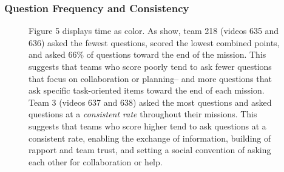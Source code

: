 \newpage%

\subsubsection{Question Frequency and Consistency}




\begin{figure}[h!]
    \centering
    \caption{Figure 5 displays time as color. As show, team 218 (videos 635 and 636) asked the
fewest questions, scored the lowest combined points, and asked 66\%
of questions toward the end of the mission. This suggests that teams who score poorly tend to ask fewer questions that focus on collaboration or planning-- and more questions that ask specific task-oriented items toward the end of each mission. Team 3 (videos 637 and 638) asked the most questions and asked questions at a \emph{consistent rate} throughout their missions. This suggests that teams who score higher tend to ask questions at a consistent rate, enabling the exchange of information, building of rapport and team trust, and setting a social convention of asking each other for collaboration or help. }
\end{figure}










